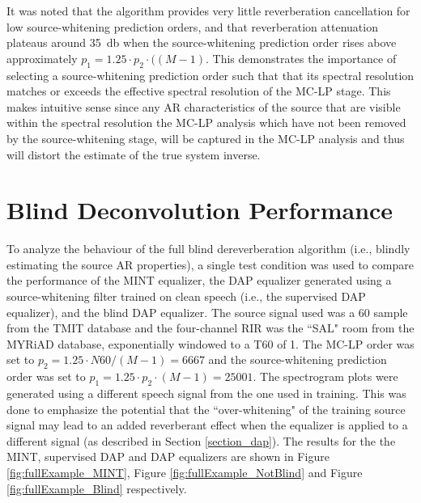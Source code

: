 It was noted that the algorithm provides very little reverberation cancellation for low source-whitening prediction orders, and that reverberation attenuation plateaus around \qty{35}{\decibel} when the source-whitening prediction order rises above approximately $p_1 = 1.25 \cdot p_2 \cdot (\left(M-1\right)$. This demonstrates the importance of selecting a source-whitening prediction order such that that its spectral resolution matches or exceeds the effective spectral resolution of the MC-LP stage. This makes intuitive sense since any AR characteristics of the source that are visible within the spectral resolution the MC-LP analysis which have not been removed by the source-whitening stage, will be captured in the MC-LP analysis and thus will distort the estimate of the true system inverse.

\section{Blind Deconvolution Performance}

To analyze the behaviour of the full blind dereverberation algorithm (i.e., blindly estimating the source AR properties), a single test condition was used to compare the performance of the MINT equalizer, the DAP equalizer generated using a source-whitening filter trained on clean speech (i.e., the supervised DAP equalizer), and the blind DAP equalizer. The source signal used was a \qty{60}{\sec} sample from the TMIT database and the four-channel RIR was the ``SAL" room from the MYRiAD database, exponentially windowed to a T60 of \qty{1}{\sec}. The MC-LP order was set to $p_2 = 1.25 \cdot N60 / \left(M-1\right)=6667$ and the source-whitening prediction order was set to $p_1 = 1.25 \cdot p_2 \cdot \left(M-1\right)=25001$. The spectrogram plots were generated using a different speech signal from the one used in training. This was done to emphasize the potential that the ``over-whitening" of the training source signal may lead to an added reverberant effect when the equalizer is applied to a different signal (as described in Section \ref{section_dap}). The results for the the MINT, supervised DAP and DAP equalizers are shown in Figure \ref{fig:fullExample_MINT}, Figure \ref{fig:fullExample_NotBlind} and Figure \ref{fig:fullExample_Blind} respectively.

%

